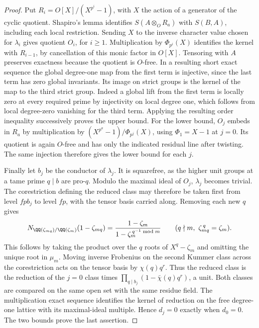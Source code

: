 \documentclass[a4paper,11pt]{article}
\theoremstyle{definition}
\theoremstyle{remark}
\numberwithin{equation}{section}
\begin{document}
\begin{proof}
Put \(R_i=O[X]/(X^{p^i}-1)\), with \(X\) the action of a
generator of the cyclic quotient. Shapiro's lemma identifies
\(S(A\otimes_O R_a)\) with \(S(B,A)\), including each local
restriction. Sending \(X\) to the inverse character value chosen
for \(\lambda_i\) gives quotient \(O_i\), for \(i\ge1\).
Multiplication by \(\Phi_{p^i}(X)\) identifies the kernel with
\(R_{i-1}\), by cancellation of this monic factor in \(O[X]\).
Tensoring with \(A\) preserves exactness because the quotient
is \(O\)-free. In a resulting short exact sequence the global
degree-one map from the first term is injective, since the last
term has zero global invariants. Its image on strict groups is
the kernel of the map to the third strict group. Indeed a global
lift from the first term is locally zero at every required prime
by injectivity on local degree one, which follows from local
degree-zero vanishing for the third term. Applying the resulting
order inequality successively proves the upper bound. For the
lower bound, \(O_j\) embeds in \(R_a\) by multiplication by
\((X^{p^a}-1)/\Phi_{p^j}(X)\), using \(\Phi_1=X-1\) at \(j=0\).
Its quotient is again \(O\)-free and has only the indicated
residual line after twisting. The same injection therefore gives
the lower bound for each \(j\).

Finally let \(b_j\) be the conductor of \(\lambda_j\).
It is squarefree, as the higher unit groups at a tame prime
\(q\mid b\) are pro-\(q\). Modulo the maximal ideal of \(O_j\),
\(\lambda_j\) becomes trivial. The corestriction defining the
reduced class may therefore be taken first from level \(fpb_j\)
to level \(fp\), with the tensor basis carried along. Removing
each new \(q\) gives
\[
  N_{\QQ(\zeta_{mq})/\QQ(\zeta_m)}(1-\zeta_{mq})
      =\frac{1-\zeta_m}{1-\zeta_m^{\,q^{-1}\bmod m}}
                \qquad(q\nmid m,\ \zeta_{mq}^{\,q}=\zeta_m).
\]
This follows by taking the product over the \(q\) roots of
\(X^q-\zeta_m\) and omitting the unique root in \(\mu_m\).
Moving inverse Frobenius on the second Kummer class across the
corestriction acts on the tensor basis by \(\chi(q)q^r\).
Thus the reduced class is the reduction of the \(j=0\) class
times \(\prod_{q\mid b_j}(1-\bar\chi(q)q^r)\), a unit.
Both classes are compared on the same open set with the same
residue field. The multiplication exact sequence identifies
the kernel of reduction on the free degree-one lattice with its
maximal-ideal multiple. Hence \(d_j=0\) exactly when \(d_0=0\).
The two bounds prove the last assertion.
\end{proof}
\end{document}
